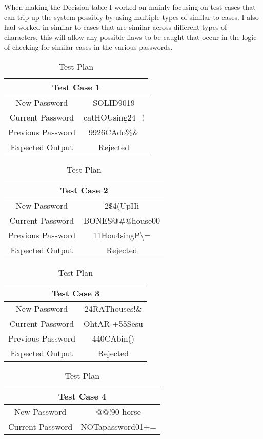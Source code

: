 \documentclass[12pt,letterpaper]{article}
\begin{document}
When making the Decision table I worked on mainly focusing on test cases that can trip up the
system possibly by using multiple types of similar to cases.  I also had worked in similar to cases
that are similar across different types of characters, this will allow any possible
flaws to be caught that occur in the logic of checking for similar cases in the
various passwords.

\begin{table}[h]
  \caption{Test Plan}
  \label{tab:Test Plan}
\begin{centering}
  \begin{tabular}{||c|c||}
  \hline
  \multicolumn{2}{||c||}{Test Case 1} \\
  \hline
  New Password & SOLID9019 \\
  \hline
  Current Password & catHOUsing24\_! \\
  \hline
  Previous Password & 9926CAdo\%\& \\
  \hline
  Expected Output & Rejected \\
  \hline
  \end{tabular}
  \begin{tabular}{||c|c||}
  \hline
  \multicolumn{2}{||c||}{Test Case 2} \\
  \hline
  New Password & 2\$4(UpHi \\
  \hline
  Current Password & BONES@\#@house00 \\
  \hline
  Previous Password & 11Hou4singP\textbackslash= \\
  \hline
  Expected Output & Rejected \\
  \hline
  \end{tabular}
  \begin{tabular}{||c|c||}
  \hline
  \multicolumn{2}{||c||}{Test Case 3} \\
  \hline
  New Password & 24RAThouses!\& \\
  \hline
  Current Password & OhtAR-+55Sesu \\
  \hline
  Previous Password & 440CAbin() \\
  \hline
  Expected Output & Rejected \\
  \hline
  \end{tabular}
  \begin{tabular}{||c|c||}
  \hline
  \multicolumn{2}{||c||}{Test Case 4} \\
  \hline
  New Password & @@!90 horse \\
  \hline
  Current Password & NOTapassword01+= \\

\end{tabular}
\end{centering}
\end{table}
\end{document}
